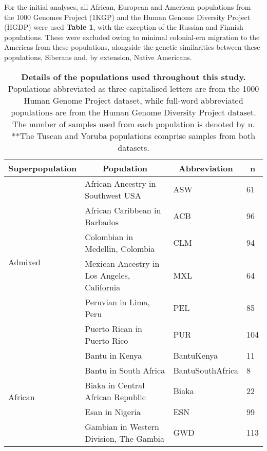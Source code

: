 \documentclass[11pt]{article}
\begin{document}
For the initial analyses, all African, European and American populations from the 1000 Genomes Project (1KGP) and the Human Genome Diversity Project (HGDP) were used \textbf{Table 1}, with the exception of the Russian and Finnish populations. These were excluded owing to minimal colonial-era migration to the Americas from these populations, alongside the genetic similarities between these populations, Siberans and, by extension, Native Americans.



\begin{table}[htb]
    \centering
    \caption{
        \textbf{Details of the populations used throughout this study.} 
        Populations abbreviated as three capitalised letters are from the 1000 Human Genome Project dataset, while full-word abbreviated populations are from the Human Genome Diversity Project dataset. The number of samples used from each population is denoted by n. \\
        **The Tuscan and Yoruba populations comprise samples from both datasets.
        }
    \vspace{.2cm}
    \small
    \begin{tabular}{ |p{3cm}||p{8cm}|p{3cm}|p{0.8cm}|  }
    \hline
    \multicolumn{1}{|c||}{\textbf{Superpopulation}} &
    \multicolumn{1}{c|}{\textbf{Population}} & 
    \multicolumn{1}{c|}{\textbf{Abbreviation}} & %
    \multicolumn{1}{c|}{\textbf{n}}\\
    \hline
    \hline
    \multirow{6}{*}{Admixed}  %
        &African Ancestry in Southwest USA & ASW & 61 \\
        &African Caribbean in Barbados & ACB & 96 \\
        &Colombian in Medellin, Colombia & CLM & 94 \\
        &Mexican Ancestry in Los Angeles, California & MXL & 64 \\
        &Peruvian in Lima, Peru & PEL & 85 \\
        &Puerto Rican in Puerto Rico & PUR & 104 \\
        \hline
    \multirow{11}{*}{African}
        &Bantu in Kenya & BantuKenya & 11 \\
        &Bantu in South Africa & BantuSouthAfrica & 8 \\
        &Biaka in Central African Republic & Biaka & 22 \\
        &Esan in Nigeria & ESN & 99 \\
        &Gambian in Western Division, The Gambia & GWD & 113 \\

\end{tabular}
\end{table}
\end{document}
